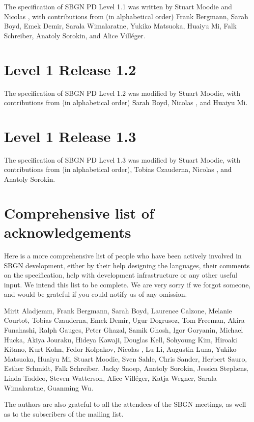 The specification of SBGN PD Level 1.1 was written by Stuart Moodie and Nicolas \lenov{}, with contributions from (in alphabetical order) Frank Bergmann, Sarah Boyd, Emek Demir, Sarala Wimalaratne, Yukiko Matsuoka, Huaiyu Mi, Falk Schreiber, Anatoly Sorokin, and Alice Vill\'{e}ger.

\section{Level 1 Release 1.2}

The specification of SBGN PD Level 1.2 was modified by Stuart Moodie, with contributions from (in alphabetical order) Sarah Boyd, Nicolas \lenov{}, and Huaiyu Mi.

\section{Level 1 Release 1.3}

The specification of SBGN PD Level 1.3 was modified by Stuart Moodie, with contributions from (in alphabetical order), Tobias Czauderna, Nicolas \lenov{}, and Anatoly Sorokin.

\section{Comprehensive list of acknowledgements}

Here is a more comprehensive list of people who have been actively involved in SBGN development, either by their help designing the languages, their comments on the specification, help with development infrastructure or any other useful input.  We intend this list to be complete. We are very sorry if we forgot someone, and would be grateful if you could notify us of any omission.

Mirit Aladjemm, Frank Bergmann, Sarah Boyd, Laurence Calzone, Melanie Courtot, Tobias Czauderna, Emek Demir, Ugur Dogrusoz, Tom Freeman, Akira Funahashi, Ralph Gauges, Peter Ghazal, Samik Ghosh, Igor Goryanin, Michael Hucka, Akiya Jouraku, Hideya Kawaji, Douglas Kell, Sohyoung Kim, Hiroaki Kitano, Kurt Kohn, Fedor Kolpakov, Nicolas \lenov{}, Lu Li, Augustin Luna, Yukiko Matsuoka, Huaiyu Mi, Stuart Moodie, Sven Sahle, Chris Sander, Herbert Sauro, Esther Schmidt, Falk Schreiber, Jacky Snoep, Anatoly Sorokin, Jessica Stephens, Linda Taddeo, Steven Watterson, Alice Vill\'{e}ger, Katja Wegner, Sarala Wimalaratne, Guanming Wu.

The authors are also grateful to all the attendees of the SBGN meetings, as 
well as to the subscribers of the  mailing list.


